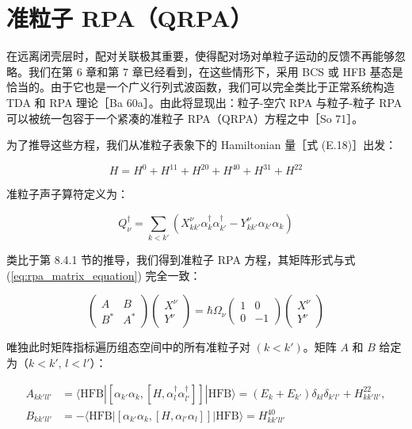 \section{准粒子 RPA（QRPA）\label{sec:8.9_=0051C6=007C92=005B50RPA=00FF08QRPA=00FF09}}

在远离闭壳层时，配对关联极其重要，使得配对场对单粒子运动的反馈不再能够忽略。我们在第 6 章和第 7 章已经看到，在这些情形下，采用
BCS 或 HFB 基态是恰当的。由于它也是一个广义行列式波函数，我们可以完全类比于正常系统构造 TDA 和 RPA 理论［Ba 60a］。由此将显现出：粒子-空穴
RPA 与粒子-粒子 RPA 可以被统一包容于一个紧凑的准粒子 RPA（QRPA）方程之中［So 71］。

为了推导这些方程，我们从准粒子表象下的 Hamiltonian 量［式 (E.18)］出发：

\begin{equation}
H=H^{0}+H^{11}+H^{20}+H^{40}+H^{31}+H^{22}\label{eq:qrpa_h_quasiparticle_decomp}
\end{equation}

准粒子声子算符定义为：

\begin{equation}
Q^{\dagger}_{\nu}=\sum_{k<k'}\left(X^{\nu}_{kk'}\alpha^{\dagger}_{k}\alpha^{\dagger}_{k'}-Y^{\nu}_{kk'}\alpha_{k'}\alpha_{k}\right)\label{eq:qrpa_phonon_creation_def}
\end{equation}

类比于第 8.4.1 节的推导，我们得到准粒子 RPA 方程，其矩阵形式与式 (\ref{eq:rpa_matrix_equation})
完全一致：

\begin{equation}
\begin{pmatrix}A & B\\
B^{*} & A^{*}
\end{pmatrix}\begin{pmatrix}X^{\nu}\\
Y^{\nu}
\end{pmatrix}=\hbar\Omega_{\nu}\begin{pmatrix}1 & 0\\
0 & -1
\end{pmatrix}\begin{pmatrix}X^{\nu}\\
Y^{\nu}
\end{pmatrix}\label{eq:qrpa_matrix_equation}
\end{equation}

唯独此时矩阵指标遍历组态空间中的所有准粒子对 $(k<k')$。矩阵 $A$ 和 $B$ 给定为（$k<k',\,l<l'$）：

\begin{align}
A_{kk'll'} & =\langle\text{HFB}|[\alpha_{k'}\alpha_{k},[H,\alpha^{\dagger}_{l}\alpha^{\dagger}_{l'}]]|\text{HFB}\rangle=(E_{k}+E_{k'})\delta_{kl}\delta_{k'l'}+H^{22}_{kk'll'},\nonumber \\
B_{kk'll'} & =-\langle\text{HFB}|[\alpha_{k'}\alpha_{k},[H,\alpha_{l'}\alpha_{l}]]|\text{HFB}\rangle=H^{40}_{kk'll'}\label{eq:qrpa_ab_matrices_def}
\end{align}

